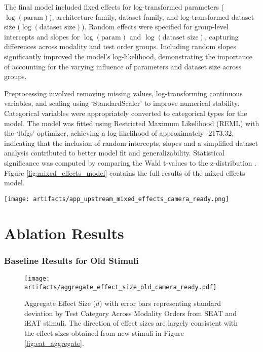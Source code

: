 The final model included fixed effects for log-transformed parameters ($\log(\text{param})$), architecture family, dataset family, and log-transformed dataset size ($\log(\text{dataset size})$). Random effects were specified for group-level intercepts and slopes for $\log(\text{param})$ and $\log(\text{dataset size})$, capturing differences across modality and test order groups. Including random slopes significantly improved the model's log-likelihood, demonstrating the importance of accounting for the varying influence of parameters and dataset size across groups.

Preprocessing involved removing missing values, log-transforming continuous variables, and scaling using `StandardScaler' to improve numerical stability. Categorical variables were appropriately converted to categorical types for the model. The model was fitted using Restricted Maximum Likelihood (REML) with the `lbfgs' optimizer, achieving a log-likelihood of approximately -2173.32, indicating that the inclusion of random intercepts, slopes and a simplified dataset analysis contributed to better model fit and generalizability. Statistical significance was computed by comparing the Wald t-values to the z-distribution \citep{luke2017evaluating}. Figure \ref{fig:mixed_effects_model} contains the full results of the mixed effects model.

\begin{figure*}[h]
    \centering
    \texttt{[image: artifacts/app\_upstream\_mixed\_effects\_camera\_ready.png]}
    \caption{Full mixed effects regression results to measure impact of upstream factors on intrinsic bias.}
    \label{fig:mixed_effects_model}
\end{figure*}


\section{Ablation Results}
\subsubsection{Baseline Results for Old Stimuli}
\label{apd:old_aggregate}

\begin{figure}[h]
    \centering
    \texttt{[image: artifacts/aggregate\_effect\_size\_old\_camera\_ready.pdf]}
    \caption{Aggregate Effect Size ($d$) with error bars representing standard deviation by Test Category Across Modality Orders from SEAT and iEAT stimuli. The direction of effect sizes are largely consistent with the effect sizes obtained from new stimuli in Figure \ref{fig:eat_aggregate}. }
    \label{fig:old_effect_size}
\end{figure}


